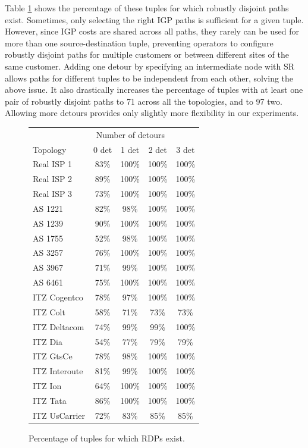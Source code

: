 Table \ref{tab:rdp_existence} shows the percentage of these tuples for which robustly
disjoint paths exist. Sometimes, only selecting the right IGP paths is sufficient
for a given tuple. However, since IGP costs are shared across all
paths, they rarely can be used for more than one source-destination
tuple, preventing operators to configure robustly disjoint paths for
multiple customers or between different sites of the same customer.
Adding one detour by specifying an intermediate node with SR
allows paths for different tuples to be independent from each other,
solving the above issue. It also drastically increases the percentage
of tuples with at least one pair of robustly disjoint paths to 71%
across all the topologies, and to 97%
two. Allowing more detours provides only slightly more flexibility
in our experiments.

\begin{figure}
\begin{center}
\begin{tabular}{ l | c c c c }
  \toprule
  & \multicolumn{3}{c}{Number of detours} \\
  Topology & 0 det & 1 det & 2 det & 3 det \\
  \midrule
  Real ISP 1 & 83\% & 100\% & 100\% & 100\% \\
  Real ISP 2 & 89\% & 100\% & 100\% & 100\% \\
  Real ISP 3 & 73\% & 100\% & 100\% & 100\% \\
  \midrule
  AS 1221 & 82\% & 98\% & 100\% & 100\% \\
  AS 1239 & 90\% & 100\% & 100\% & 100\% \\
  AS 1755 & 52\% & 98\% & 100\% & 100\% \\
  AS 3257 & 76\% & 100\% & 100\% & 100\% \\
  AS 3967 & 71\% & 99\% & 100\% & 100\% \\
  AS 6461 & 75\% & 100\% & 100\% & 100\% \\
  \midrule
  ITZ Cogentco & 78\% & 97\% & 100\% & 100\% \\ 
  ITZ Colt & 58\% & 71\% & 73\% & 73\% \\
  ITZ Deltacom & 74\% & 99\% & 99\% & 100\% \\
  ITZ Dia & 54\% & 77\% & 79\% & 79\% \\
  ITZ GtsCe & 78\% & 98\% & 100\% & 100\% \\
  ITZ Interoute & 81\% & 99\% & 100\% & 100\% \\
  ITZ Ion & 64\% & 100\% & 100\% & 100\% \\
  ITZ Tata & 86\% & 100\% & 100\% & 100\% \\
  ITZ UsCarrier & 72\% & 83\% & 85\% & 85\% \\
  \bottomrule
\end{tabular}
\end{center}
\caption{Percentage of tuples for which RDPs exist.}
\label{tab:rdp_existence}
\end{figure}

